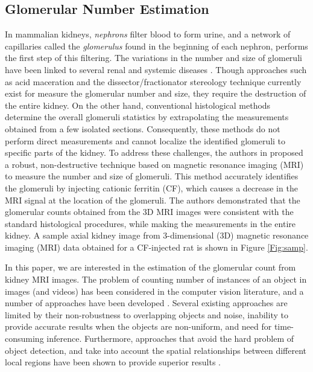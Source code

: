 \subsection{Glomerular Number Estimation}
In mammalian kidneys, \textit{nephrons} filter blood to form urine, and a network of capillaries called the \textit{glomerulus} found in the beginning of each nephron, performs the first step of this filtering. The variations in the number and size of glomeruli have been linked to several renal and systemic diseases \cite{brenner1988glomeruli, hoy2008nephron}. Though approaches such as acid maceration \cite{bonvalet1972compensatory} and the dissector/fractionator stereology technique \cite{bertram1992total} currently exist for measure the glomerular number and size, they require the destruction of the entire kidney. On the other hand, conventional histological methods determine the overall glomeruli statistics by extrapolating the measurements obtained from a few isolated sections. Consequently, these methods do not perform direct measurements and cannot localize the identified glomeruli to specific parts of the kidney. To address these challenges, the authors in \cite{beeman2011measuring} proposed a robust, non-destructive technique based on magnetic resonance imaging (MRI) to measure the number and size of glomeruli. This method accurately identifies the glomeruli by injecting cationic ferritin (CF), which causes a decrease in the MRI signal at the location of the glomeruli. The authors demonstrated that the glomerular counts obtained from the 3D MRI images were consistent with the standard histological procedures, while making the measurements in the entire kidney. A sample axial kidney image from 3-dimensional (3D) magnetic resonance imaging (MRI) data obtained for a CF-injected rat is shown in Figure \ref{Fig:samp}.


In this paper, we are interested in the estimation of the glomerular count from kidney MRI images. The problem of counting number of instances of an object in images (and videos) has been considered in the computer vision literature, and a number of approaches have been developed \cite{}. Several existing approaches are limited by their non-robustness to overlapping objects and noise, inability to provide accurate results when the objects are non-uniform, and need for time-consuming inference. Furthermore, approaches that avoid the hard problem of object detection, and take into account the spatial relationships between different local regions have been shown to provide superior results \cite{}. 

